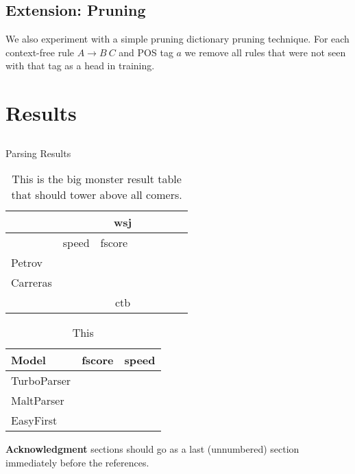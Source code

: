 \documentclass[11pt,letterpaper]{article}
\begin{document}



\subsection{Extension: Pruning}

We also experiment with a simple pruning dictionary pruning technique.
For each context-free rule $A \rightarrow B\ C$ and POS tag $a$ we
remove all rules that were not seen with that tag as a head in training.



\subsection{}

\section{Results}


\subsection{}


\begin{table*}
  \centering
  Parsing Results


  \begin{tabular}{l|lllllll}
    \hline
    & \multicolumn{7}{|c}{wsj} \\
    \hline
    & speed & fscore \\
    \hline
    Petrov & & & \\
    Carreras & & & \\
    \hline
    \hline
    & \multicolumn{7}{|c}{ctb} \\
    \hline
  \end{tabular}
  \caption{This is the big monster result table that should tower above all comers. }
\end{table*}

\begin{table}
  \centering
  \begin{tabular}{l|ll}
    Model & fscore & speed  \\
    \hline
    TurboParser & & \\
    MaltParser & & \\
    EasyFirst & & \\
  \end{tabular}
  \caption{This }
\end{table}

\textbf{Acknowledgment} sections should go as a last (unnumbered) section immediately
before the references.

% 
% 
\end{document}

